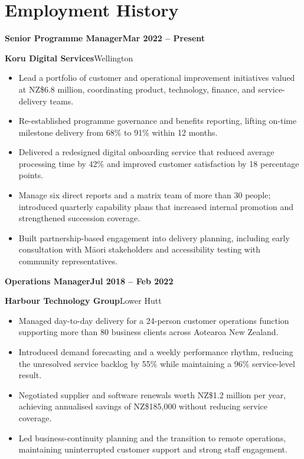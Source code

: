 \documentclass[10pt,a4paper]{article}
\newcommand{\job}[4]{%
  \textbf{#1}\hfill\textbf{#2}\par
  \textcolor{pounamu}{\textbf{#3}}\hfill\textcolor{muted}{#4}\par
}
\begin{document}
\section*{Employment History}

\job{Senior Programme Manager}{Mar 2022 -- Present}{Koru Digital Services}{Wellington}
\begin{itemize}
  \item Lead a portfolio of customer and operational improvement initiatives valued at NZ\$6.8 million, coordinating product, technology, finance, and service-delivery teams.
  \item Re-established programme governance and benefits reporting, lifting on-time milestone delivery from 68\% to 91\% within 12 months.
  \item Delivered a redesigned digital onboarding service that reduced average processing time by 42\% and improved customer satisfaction by 18 percentage points.
  \item Manage six direct reports and a matrix team of more than 30 people; introduced quarterly capability plans that increased internal promotion and strengthened succession coverage.
  \item Built partnership-based engagement into delivery planning, including early consultation with Māori stakeholders and accessibility testing with community representatives.
\end{itemize}

\vspace{3pt}
\job{Operations Manager}{Jul 2018 -- Feb 2022}{Harbour Technology Group}{Lower Hutt}
\begin{itemize}
  \item Managed day-to-day delivery for a 24-person customer operations function supporting more than 80 business clients across Aotearoa New Zealand.
  \item Introduced demand forecasting and a weekly performance rhythm, reducing the unresolved service backlog by 55\% while maintaining a 96\% service-level result.
  \item Negotiated supplier and software renewals worth NZ\$1.2 million per year, achieving annualised savings of NZ\$185,000 without reducing service coverage.
  \item Led business-continuity planning and the transition to remote operations, maintaining uninterrupted customer support and strong staff engagement.
\end{itemize}

\newpage
\end{document}

